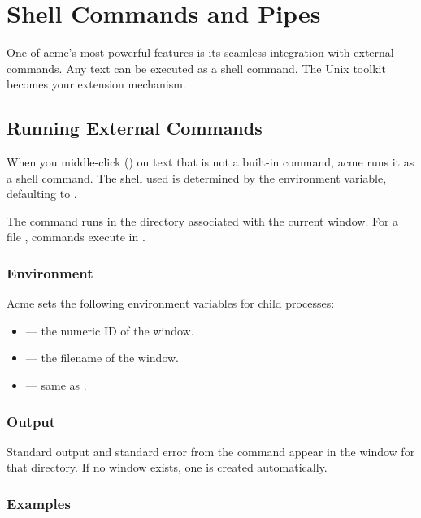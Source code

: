 \chapter{Shell Commands and Pipes}
\label{ch:shell}


One of acme's most powerful features is its seamless integration with
external commands.  Any text can be executed as a shell command.  The
Unix toolkit becomes your extension mechanism.

\section{Running External Commands}
\label{sec:external}


When you middle-click () on text that is not a built-in
command, acme runs it as a shell command.  The shell used is determined
by the  environment variable, defaulting to .

The command runs in the directory associated with the current window.
For a file , commands execute in
.

\subsection{Environment}

Acme sets the following environment variables for child processes:

\begin{itemize}
\item {} --- the numeric ID of the window.
\item \env{\%} --- the filename of the window.
\item {} --- same as \env{\%}.
\end{itemize}

\subsection{Output}

Standard output and standard error from the command appear in the
 window for that directory.  If no  window
exists, one is created automatically.

\subsection{Examples}

